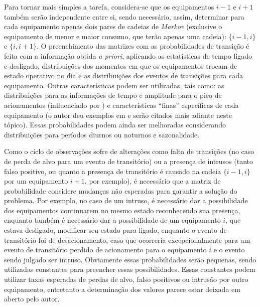 \begin{enumerate}[label=\textbf{1.\arabic*},wide=\parindent]

Para tornar mais simples a tarefa, considera-se que os equipamentos $i-1$
e $i+1$ também serão independente entre si, sendo necessário, assim,
determinar para cada equipamento apenas dois pares de cadeias de
\emph{Markov} (exclusive o equipamento de menor e maior consumo, que
terão apenas uma cadeia): $\{i-1,i\}$ e $\{i,i+1\}$. O preenchimento das
matrizes com as probabilidades de transição é feita com a informação
obtida \emph{a priori}, aplicando as estatísticas de tempo ligado e
desligado, distribuições dos momentos em que os equipamentos trocam de
estado operativo no dia e as distribuições dos eventos de transições
para cada equipamento. Outras características podem ser utilizadas, tais
como: as distribuições para as informações de tempo e amplitude para o
pico de acionamentos (influenciado por
\cite{nilm_baranski_genetic_base_2003_19,
nilm_baranski_genetic_detalhado_2004_20,nilm_baranski_summary_2004_21})
e características ``finas'' específicas de cada equipamento (o autor deu
exemplos em \cite{nilm_zeifman_statistical_naive_enduses_2013} e serão
citados mais adiante neste tópico). Essas probabilidades podem ainda
ser melhoradas considerando distribuições para períodos diurnos ou
noturnos e sazonalidade.

Como o ciclo de observações sofre de alterações como falta de
transições (no caso de perda de alvo para um evento de transitório) ou a
presença de intrusos (tanto falso positivo, ou quanto a presença de
transitório é causado na cadeia $\{i-1,i\}$ por um equipamento
$i+1$, por exemplo), é necessário que a matriz de
probabilidade considere mudanças não esperadas para garantir a solução
do problema. Por exemplo, no caso de um intruso, é necessário dar a
possibilidade dos equipamentos continuarem no mesmo estado reconhecendo
sua presença, enquanto também é necessário dar a possibilidade de um equipamento
$i$, que estava desligado, modificar seu estado para ligado, enquanto
o evento de transitório foi de desacionamento, caso que ocorreria
excepcionalmente para um evento de transitório perdido de acionamento para
o equipamento $i$ e o evento sendo julgado ser intruso. Obviamente essas
probabilidades serão pequenas, sendo utilizadas constantes para
preencher essas possibilidades. Essas constantes podem utilizar taxas
esperadas de perdas de alvo, falso positivos ou intrusão por outro
equipamento, entretanto a determinação dos valores parece estar deixada
em aberto pelo autor.


\end{enumerate}

